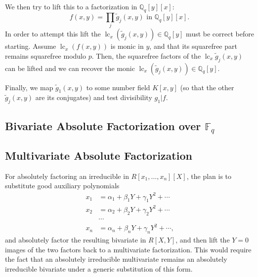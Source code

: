 \documentclass[11pt,reqno]{amsart}
\numberwithin{equation}{section}
\begin{document}
We then try to lift this to a factorization in $\mathbb{Q}_q[y][x]$:
\begin{equation*}
f(x,y) = \prod_j \widetilde{g}_j(x,y) \text{ in } \mathbb{Q}_q[y][x]\text{.}
\end{equation*}
In order to attempt this lift the
$\operatorname{lc}_x(\widetilde{g}_j(x,y)) \in \mathbb{Q}_q[y]$ must be correct
before starting. Assume $\operatorname{lc}_x(f(x,y))$ is monic in $y$, and that
its squarefree part remains squarefree modulo $p$. Then, the squarefree factors
of the $\operatorname{lc}_x \widetilde{g}_j(x,y)$ can be lifted and we can
recover the monic
$\operatorname{lc}_x(\widetilde{g}_j(x,y)) \in \mathbb{Q}_q[y]$.

Finally, we map $\widetilde{g}_1(x,y)$ to some number field $K[x,y]$ (so that
the other $\widetilde{g}_j(x,y)$ are its conjugates) and test divisibility
$g_1|f$.

\subsection{Bivariate Absolute Factorization over $\mathbb{F}_q$}



\subsection{Multivariate Absolute Factorization}
For absolutely factoring  an irreducible in $R[x_1,\dots,x_n][X]$, the plan is 
to substitute good auxiliary polynomials
\begin{align*}
x_1 &= \alpha_1 + \beta_1 Y + \gamma_1 Y^2 + \cdots\\
x_2 &= \alpha_2 + \beta_2 Y + \gamma_2 Y^2 + \cdots\\
&\cdots\\
x_n &= \alpha_n + \beta_n Y + \gamma_n Y^2 + \cdots\text{,}
\end{align*}
and absolutely factor the resulting bivariate in $R[X,Y]$, and then lift the
$Y=0$ images of the two factors back to a multivariate factorization. This
would require the fact that an absolutely irreducible multivariate remains an
absolutely irreducible bivariate under a generic substitution of this form.
\end{document}
